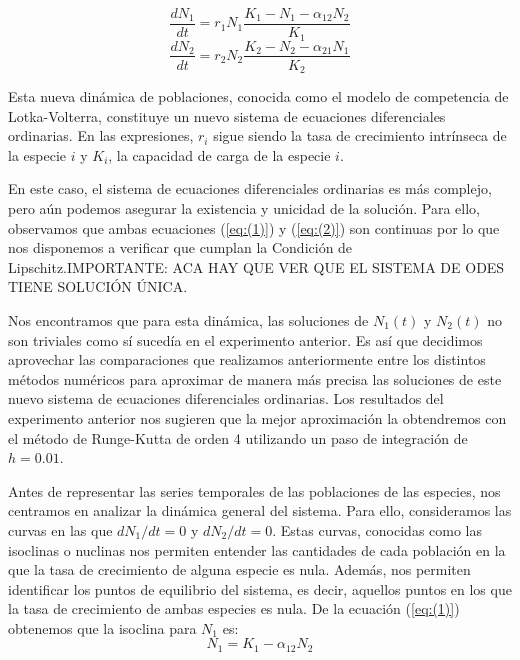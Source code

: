 \documentclass{article}
\begin{document}
\begin{equation}
\frac {dN_1} {dt} = r_1N_1 \frac {K_1 - N_1 - \alpha_{12}N_2} {K_1} \label{eq:(1)}
\end{equation}
\begin{equation}
\frac {dN_2} {dt} = r_2N_2 \frac {K_2 - N_2 - \alpha_{21}N_1} {K_2} \label{eq:(2)}
\end{equation}

Esta nueva dinámica de poblaciones, conocida como el modelo de competencia de Lotka-Volterra, constituye un nuevo sistema de ecuaciones diferenciales ordinarias. En las expresiones, 
\(r_i\) sigue siendo la tasa de crecimiento intrínseca de la especie \(i\) y \(K_i\), la capacidad de carga de la especie \(i\). 

En este caso, el sistema de ecuaciones diferenciales ordinarias es más complejo, pero aún podemos asegurar la existencia y unicidad de la solución. Para ello, observamos que ambas
ecuaciones (\ref{eq:(1)}) y (\ref{eq:(2)}) son continuas por lo que nos disponemos a verificar que cumplan la Condición de Lipschitz.IMPORTANTE: ACA HAY QUE VER QUE EL SISTEMA DE ODES TIENE SOLUCIÓN ÚNICA. 

Nos encontramos que para esta dinámica, las soluciones de \(N_1(t)\) y \(N_2(t)\) no son triviales como sí sucedía en el experimento anterior. Es así que decidimos aprovechar las comparaciones
que realizamos anteriormente entre los distintos métodos numéricos para aproximar de manera más precisa las soluciones de este nuevo sistema de ecuaciones diferenciales ordinarias. Los resultados 
del experimento anterior nos sugieren que la mejor aproximación la obtendremos con el método de Runge-Kutta de orden 4 utilizando un paso de integración de \(h = 0.01\). 

Antes de representar las series temporales de las poblaciones de las especies, nos centramos en analizar la dinámica general del sistema. Para ello, consideramos las curvas en las que
\(dN_1/dt = 0\) y \(dN_2/dt = 0\). Estas curvas, conocidas como las isoclinas o nuclinas nos permiten entender las cantidades de cada población en la que la tasa de crecimiento de alguna especie es nula. Además, nos permiten identificar los puntos de equilibrio del sistema, es decir, aquellos puntos en los que la tasa de crecimiento de ambas especies es nula. De la ecuación (\ref{eq:(1)})
obtenemos que la isoclina para \(N_1\) es:
\begin{equation}
N_1 = K_1 - \alpha_{12}N_2 \label{eq:(3)}
\end{equation}
\end{document}
